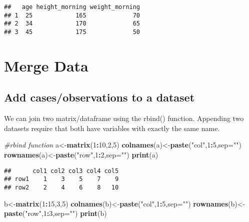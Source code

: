 \documentclass[]{book}
\newenvironment{Shaded}{\begin{snugshade}}{\end{snugshade}}
\newcommand{\KeywordTok}[1]{\textcolor[rgb]{0.13,0.29,0.53}{\textbf{#1}}}
\newcommand{\DataTypeTok}[1]{\textcolor[rgb]{0.13,0.29,0.53}{#1}}
\newcommand{\DecValTok}[1]{\textcolor[rgb]{0.00,0.00,0.81}{#1}}
\newcommand{\StringTok}[1]{\textcolor[rgb]{0.31,0.60,0.02}{#1}}
\newcommand{\CommentTok}[1]{\textcolor[rgb]{0.56,0.35,0.01}{\textit{#1}}}
\newcommand{\OperatorTok}[1]{\textcolor[rgb]{0.81,0.36,0.00}{\textbf{#1}}}
\newcommand{\NormalTok}[1]{#1}
\theoremstyle{definition}
\theoremstyle{definition}
\theoremstyle{definition}
\theoremstyle{remark}
\begin{document}
\begin{verbatim}
##   age height_morning weight_morning
## 1  25            165             70
## 2  34            170             65
## 3  45            175             50
\end{verbatim}

\section{Merge Data}\label{merge-data}

\subsection{Add cases/observations to a
dataset}\label{add-casesobservations-to-a-dataset}

We can join two matrix/dataframe using the rbind() function. Appending
two datasets require that both have variables with exactly the same
name.

\begin{Shaded}
\begin{Highlighting}[]
\CommentTok{#rbind function}
\NormalTok{a<-}\KeywordTok{matrix}\NormalTok{(}\DecValTok{1}\OperatorTok{:}\DecValTok{10}\NormalTok{,}\DecValTok{2}\NormalTok{,}\DecValTok{5}\NormalTok{)}
\KeywordTok{colnames}\NormalTok{(a)<-}\KeywordTok{paste}\NormalTok{(}\StringTok{"col"}\NormalTok{,}\DecValTok{1}\OperatorTok{:}\DecValTok{5}\NormalTok{,}\DataTypeTok{sep=}\StringTok{""}\NormalTok{)}
\KeywordTok{rownames}\NormalTok{(a)<-}\KeywordTok{paste}\NormalTok{(}\StringTok{"row"}\NormalTok{,}\DecValTok{1}\OperatorTok{:}\DecValTok{2}\NormalTok{,}\DataTypeTok{sep=}\StringTok{""}\NormalTok{)}
\KeywordTok{print}\NormalTok{(a)}
\end{Highlighting}
\end{Shaded}

\begin{verbatim}
##      col1 col2 col3 col4 col5
## row1    1    3    5    7    9
## row2    2    4    6    8   10
\end{verbatim}

\begin{Shaded}
\begin{Highlighting}[]
\NormalTok{b<-}\KeywordTok{matrix}\NormalTok{(}\DecValTok{1}\OperatorTok{:}\DecValTok{15}\NormalTok{,}\DecValTok{3}\NormalTok{,}\DecValTok{5}\NormalTok{)}
\KeywordTok{colnames}\NormalTok{(b)<-}\KeywordTok{paste}\NormalTok{(}\StringTok{"col"}\NormalTok{,}\DecValTok{1}\OperatorTok{:}\DecValTok{5}\NormalTok{,}\DataTypeTok{sep=}\StringTok{""}\NormalTok{)}
\KeywordTok{rownames}\NormalTok{(b)<-}\KeywordTok{paste}\NormalTok{(}\StringTok{"row"}\NormalTok{,}\DecValTok{1}\OperatorTok{:}\DecValTok{3}\NormalTok{,}\DataTypeTok{sep=}\StringTok{""}\NormalTok{)}
\KeywordTok{print}\NormalTok{(b)}
\end{Highlighting}
\end{Shaded}
\end{document}
